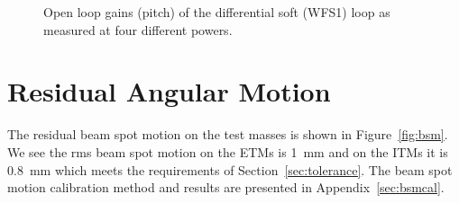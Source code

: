 \begin{figure}
\begin{centering}
\caption{Open loop gains (pitch) of the differential soft (WFS1) loop as measured at four
  different powers.}
\label{fig:DSolgs}
\end{centering}
\end{figure}





\section{Residual Angular Motion}
The residual beam spot motion on the test masses is shown in
Figure~\ref{fig:bsm}. We see the rms beam spot motion on the ETMs is
1~mm and on the ITMs it is 0.8~mm which meets the requirements of
Section~\ref{sec:tolerance}. The beam spot motion calibration method
and results are presented in Appendix~\ref{sec:bsmcal}.

